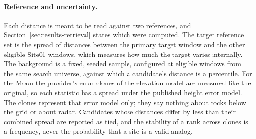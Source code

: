 \paragraph{Reference and uncertainty.} Each distance is meant to be read against two references, and Section~\ref{sec:results-retrieval} states which were computed. The target
reference set is the spread of distances between the primary target window and the other eligible
Site01 windows, which measures how much the target varies internally. The background is a fixed, seeded sample, configured at \ConfigBackgroundSample{} eligible windows from the same search universe, against
which a candidate's distance is a percentile. For the Moon the provider's \ConfigClones{} error
clones of the elevation model \citep{barker2021} are measured like the original, so each
statistic has a spread under the published height error model. The clones represent that error
model only; they say nothing about rocks below the grid or about radar. Candidates whose distances
differ by less than their combined spread are reported as tied, and the stability of a rank across
clones is a frequency, never the probability that a site is a valid analog.
